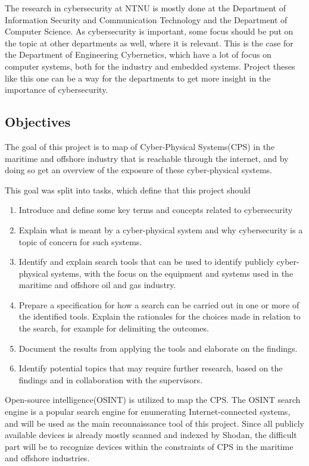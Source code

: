 The research in cybersecurity at NTNU is mostly done at the Department of Information Security and Communication Technology and  the Department of Computer Science. As cybersecurity is important, some focus should be put on the topic at other departments as well, where it is relevant. This is the case for the Department of Engineering Cybernetics, which have a lot of focus on computer systems, both for the industry and embedded systems. Project theses like this one can be a way for the departments to get more insight in the importance of cybersecurity.

\subsection{Objectives}
The goal of this project is to map of Cyber-Physical Systems(CPS) in the maritime and offshore industry that is reachable through the internet, and by doing so get an overview of the exposure of these cyber-physical systems.

This goal was split into tasks, which define that this project should
\begin{enumerate}
    \item Introduce and define some key terms and concepts related to cybersecurity
    \item Explain what is meant by a cyber-physical system and why cybersecurity is a topic of concern for such systems.
    \item Identify and explain search tools that can be used to identify publicly cyber-physical systems, with the focus on the equipment and systems used in the maritime and offshore oil and gas industry. 
    \item Prepare a specification for how a search can be carried out in one or more of the identified tools. Explain the rationales for the choices made in relation to the search, for example for delimiting the outcomes.
    \item Document the results from applying the tools and elaborate on the findings.
    \item Identify potential topics that may require further research, based on the findings and in collaboration with the supervisors.
\end{enumerate}


Open-source intelligence(OSINT) is utilized to map the CPS. The OSINT search engine \href{https://shodan.io}{\color{blue}{Shodan}}\cite{shodan} is a popular search engine for enumerating Internet-connected systems, and will be used as the main reconnaissance tool of this project. 
Since all publicly available devices is already mostly scanned and indexed by Shodan, the difficult part will be to recognize devices within the constraints of CPS in the maritime and offshore industries.


